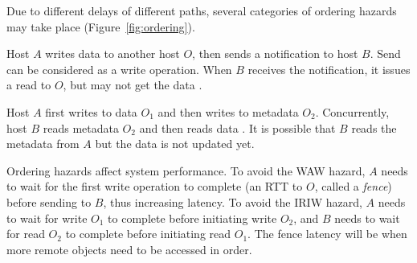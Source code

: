  Due to different delays of different paths, several categories of ordering hazards~\cite{gharachorloo1990memory,sewell2010x86} may take place (Figure~\ref{fig:ordering}).

Host $A$ writes data to another host $O$, then sends a notification to host $B$. Send can be considered as a write operation.
When $B$ receives the notification, it issues a read to $O$, but may not get the data .

Host $A$ first writes to data $O_1$ and then writes to metadata $O_2$. Concurrently, host $B$ reads metadata $O_2$ and then reads data .
It is possible that $B$ reads the metadata from $A$ but the data is not updated yet.



Ordering hazards affect system performance. To avoid the WAW hazard, $A$ needs to wait for the first write operation to complete (an RTT to $O$, called a \emph{fence}) before sending to $B$, thus increasing latency. To avoid the IRIW hazard, $A$ needs to wait for write $O_1$ to complete before initiating write $O_2$, and $B$ needs to wait for read $O_2$ to complete before initiating read $O_1$. The fence latency will be  when more remote objects need to be accessed in order.

